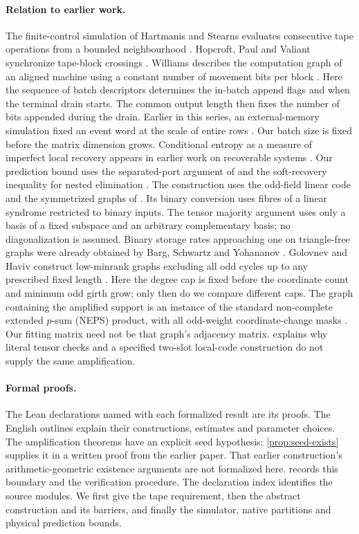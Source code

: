 \paragraph{Relation to earlier work.}
The finite-control simulation of Hartmanis and Stearns evaluates
consecutive tape operations from a bounded neighbourhood
\cite[Theorem~2]{HartmanisStearns}. Hopcroft, Paul and Valiant synchronize
tape-block crossings \cite[\S2]{HPV1977}. Williams describes the
computation graph of an aligned machine using a constant number of
movement bits per block \cite[\S\S2--3]{Williams}. Here the sequence of batch descriptors determines the in-batch append
flags and when the terminal drain starts. The common output length
then fixes the number of bits appended during the drain. Earlier in this series, an external-memory
simulation fixed an event word at the scale of entire rows
\cite[Theorem~EM]{PaperEleven}. Our batch size is fixed before the
matrix dimension grows. Conditional entropy as a measure of imperfect
local recovery appears in earlier work on recoverable systems
\cite[\S IV]{ElishcoBarg}. Our prediction bound uses the separated-port
argument of \cite[Lemma~4.1]{PaperFive} and the soft-recovery inequality
for nested elimination \cite[Theorem~S]{SoftRecovery}.
The construction uses the odd-field linear code and the symmetrized
graphs of \cite[Corollary~U(a,b)]{PaperThirteen}. Its binary conversion
uses fibres of a linear syndrome restricted to binary inputs. The
tensor majority argument uses only a basis of a fixed subspace and an
arbitrary complementary basis; no diagonalization is assumed.
Binary storage rates approaching one on triangle-free graphs were
already obtained by Barg, Schwartz and Yohananov
\cite[Theorem~2]{BSY2024}. Golovnev and Haviv construct low-minrank
graphs excluding all odd cycles up to any prescribed fixed length
\cite[Theorem~22]{GolovnevHaviv2021}. Here the degree cap is fixed
before the coordinate count and minimum odd girth grow; only then
do we compare different caps. The graph containing the amplified
support is an instance of the standard non-complete extended
$p$-sum (NEPS) product, with all odd-weight coordinate-change masks
\cite[\S2.3 and Theorem~3.1]{NEPS2011}. Our fitting matrix need not
be that graph's adjacency matrix.
 explains why literal tensor checks and a specified
two-slot local-code construction do not supply the same amplification.

\paragraph{Formal proofs.}
The Lean declarations named with each formalized result are its proofs.
The English outlines explain their constructions, estimates and parameter
choices. The amplification theorems have an explicit seed hypothesis;
\cref{prop:seed-exists} supplies it in a written proof from the earlier
paper. That earlier construction's arithmetic-geometric existence
arguments are not formalized here.  records this
boundary and the verification procedure. The declaration index identifies
the source modules. We first give the tape requirement, then the abstract
construction and its barriers, and finally the simulator, native
partitions and physical prediction bounds.
